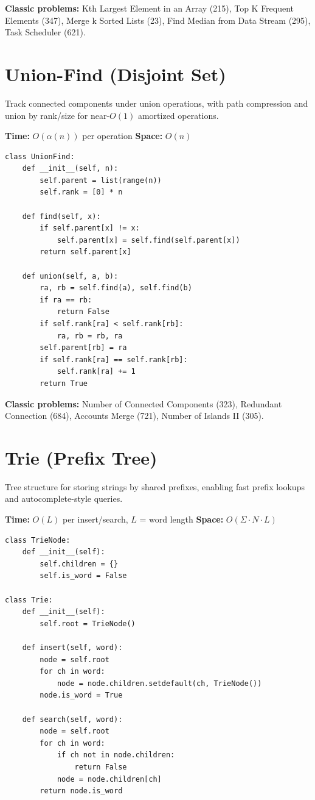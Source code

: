 \documentclass[11pt]{article}
\newcommand{\complexity}[2]{\textbf{Time:} #1 \quad \textbf{Space:} #2}
\begin{document}
\textbf{Classic problems:} Kth Largest Element in an Array (215), Top K
Frequent Elements (347), Merge k Sorted Lists (23), Find Median from Data
Stream (295), Task Scheduler (621).

\section{Union-Find (Disjoint Set)}

Track connected components under union operations, with path compression
and union by rank/size for near-$O(1)$ amortized operations.

\complexity{$O(\alpha(n))$ per operation}{$O(n)$}

\begin{lstlisting}
class UnionFind:
    def __init__(self, n):
        self.parent = list(range(n))
        self.rank = [0] * n

    def find(self, x):
        if self.parent[x] != x:
            self.parent[x] = self.find(self.parent[x])
        return self.parent[x]

    def union(self, a, b):
        ra, rb = self.find(a), self.find(b)
        if ra == rb:
            return False
        if self.rank[ra] < self.rank[rb]:
            ra, rb = rb, ra
        self.parent[rb] = ra
        if self.rank[ra] == self.rank[rb]:
            self.rank[ra] += 1
        return True
\end{lstlisting}

\textbf{Classic problems:} Number of Connected Components (323), Redundant
Connection (684), Accounts Merge (721), Number of Islands II (305).

\section{Trie (Prefix Tree)}

Tree structure for storing strings by shared prefixes, enabling fast
prefix lookups and autocomplete-style queries.

\complexity{$O(L)$ per insert/search, $L$ = word length}{$O(\Sigma \cdot N \cdot L)$}

\begin{lstlisting}
class TrieNode:
    def __init__(self):
        self.children = {}
        self.is_word = False

class Trie:
    def __init__(self):
        self.root = TrieNode()

    def insert(self, word):
        node = self.root
        for ch in word:
            node = node.children.setdefault(ch, TrieNode())
        node.is_word = True

    def search(self, word):
        node = self.root
        for ch in word:
            if ch not in node.children:
                return False
            node = node.children[ch]
        return node.is_word
\end{lstlisting}
\end{document}
